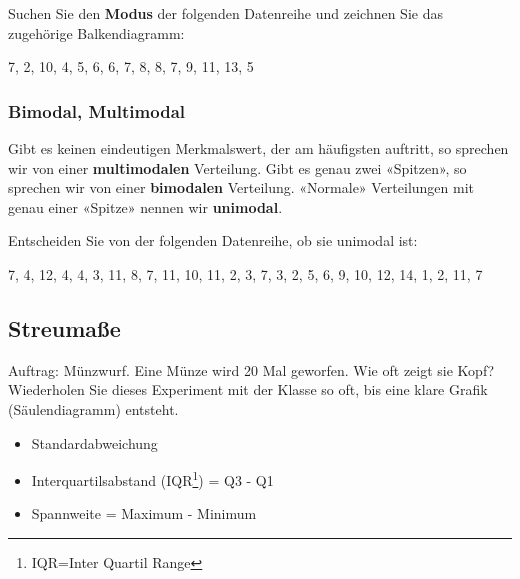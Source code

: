 Suchen Sie den \textbf{Modus} der folgenden Datenreihe und zeichnen Sie das
zugehörige Balkendiagramm:

7, 2, 10,  4, 5, 6, 6, 7, 8, 8, 7, 9, 11, 13, 5




\subsubsection{Bimodal, Multimodal}
Gibt es keinen eindeutigen Merkmalswert, der am häufigsten auftritt,
so sprechen wir von einer \textbf{multimodalen} Verteilung. Gibt es
genau zwei «Spitzen», so sprechen wir von einer \textbf{bimodalen}
Verteilung. «Normale» Verteilungen mit genau einer «Spitze» nennen wir \textbf{unimodal}.



Entscheiden Sie von der folgenden Datenreihe, ob sie unimodal ist:

7, 4, 12, 4, 4, 3,  11, 8, 7, 11, 10, 11, 2, 3, 7, 3, 2, 5, 6, 9, 10, 12, 14, 1, 2, 11, 7



\subsection{Streumaße}
Auftrag: Münzwurf. Eine Münze wird 20 Mal geworfen. Wie oft zeigt sie Kopf? Wiederholen Sie dieses Experiment mit der Klasse so oft, bis eine klare Grafik (Säulendiagramm) entsteht.


\begin{itemize}
\item Standardabweichung

\item Interquartilsabstand (IQR\footnote{IQR=Inter Quartil
    Range}) = Q3 - Q1

\item Spannweite = Maximum - Minimum

\end{itemize}
\newpage


